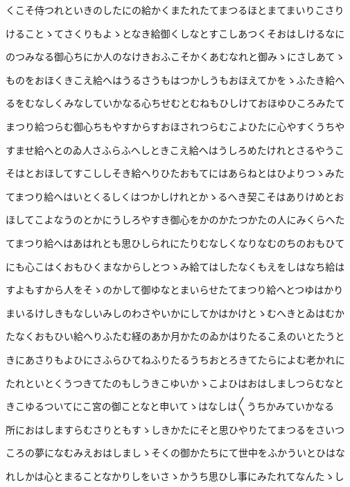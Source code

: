 \documentclass[a4paper,11pt,landscape]{ltjtarticle}
\begin{document}
\par\medskip
くこそ侍つれといきのしたにの給かくまたれたてまつるほとまてまいりこさり
\par\medskip
けることゝてさくりもよゝとなき給御くしなとすこしあつくそおはしけるなに
\par\medskip
のつみなる御心ちにか人のなけきおふこそかくあむなれと御みゝにさしあてゝ
\par\medskip
ものをおほくきこえ給へはうるさうもはつかしうもおほえてかをゝふたき給へ
\par\medskip
るをむなしくみなしていかなる心ちせむとむねもひしけておほゆひころみたて
\par\medskip
まつり給つらむ御心ちもやすからすおほされつらむこよひたに心やすくうちや
\par\medskip
すませ給へとのゐ人さふらふへしときこえ給へはうしろめたけれとさるやうこ
\par\medskip
そはとおほしてすこししそき給へりひたおもてにはあらねとはひよりつゝみた
\par\medskip
てまつり給へはいとくるしくはつかしけれとかゝるへき契こそはありけめとお
\par\medskip
ほしてこよなうのとかにうしろやすき御心をかのかたつかたの人にみくらへた
\par\medskip
てまつり給へはあはれとも思ひしられにたりむなしくなりなむのちのおもひて
\par\medskip
にも心こはくおもひくまなからしとつゝみ給てはしたなくもえをしはなち給は
\par\medskip
すよもすから人をそゝのかして御ゆなとまいらせたてまつり給へとつゆはかり
\par\medskip
まいるけしきもなしいみしのわさやいかにしてかはかけとゝむへきとゐはむか
\par\medskip
たなくおもひい給へりふたむ経のあか月かたのゐかはりたるこゑのいとたうと
\par\medskip
きにあさりもよひにさふらひてねふりたるうちおとろきてたらによむ老かれに
\par\medskip
たれといとくうつきてたのもしうきこゆいかゝこよひはおはしましつらむなと
\par\medskip
きこゆるついてにこ宮の御ことなと申いてゝはなしは〱うちかみていかなる
\par\medskip
所におはしますらむさりともすゝしきかたにそと思ひやりたてまつるをさいつ
\par\medskip
ころの夢になむみえおはしましゝそくの御かたちにて世中をふかういとひはな
\par\medskip
れしかは心とまることなかりしをいさゝかうち思ひし事にみたれてなんたゝし
\end{document}
